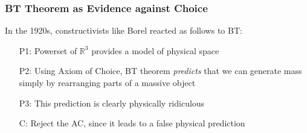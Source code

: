 \begin{frame}
\frametitle{BT Theorem as Evidence against Choice}

In the 1920s, constructivists like Borel reacted as follows to BT:

\begin{itemize}[<+->]

\item[P1:] Powerset of $\mathbb{R}^3$ provides a model of physical space

\item[P2:] Using Axiom of Choice, BT theorem \textit{predicts} that we can generate mass simply by rearranging parts of a massive object

\item[P3:] This prediction is clearly physically ridiculous 

\item[C:] Reject the AC, since it leads to a false physical prediction


\end{itemize}
\end{frame}



